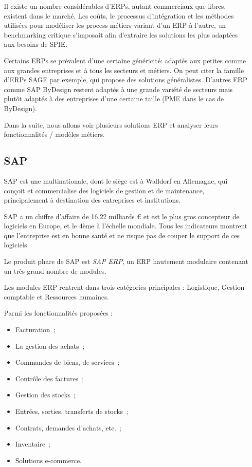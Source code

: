     Il existe un nombre considérables d'ERPs, autant commerciaux que libres, existent dans le marché. Les coûts, le processus d'intégration et les méthodes utilisées pour modéliser les process métiers variant d'un ERP à l'autre, un benchmarking critique s'imposait afin d'extraire les solutions les plus adaptées aux besoins de SPIE.

    Certains ERPs se prévalent d'une certaine généricité: adaptés aux petites comme aux grandes entreprises et à tous les secteurs et métiers. On peut citer la famille d'ERPs SAGE par exemple, qui propose des solutions généralistes. D'autres ERP comme SAP ByDesign restent adaptés à une grande variété de secteurs mais plutôt adaptés à des entreprises d'une certaine taille (PME dans le cas de ByDesign).

    Dans la suite, nous allons voir plusieurs solutions ERP et analyser leurs fonctionnalités / modèles métiers.

    \subsection{SAP}

        SAP est une multinationale, dont le siège est à Walldorf en Allemagne, qui conçoit et commercialise des logiciels de gestion et de maintenance, principalement à destination des entreprises et institutions.

        SAP a un chiffre d'affaire de 16,22 milliards € et est le plus gros concepteur de logiciels en Europe, et le 4ème à l'échelle mondiale. Tous les indicateurs montrent que l'entreprise est en bonne santé et ne risque pas de couper le support de ces logiciels.

        Le produit phare de SAP est \textit{SAP ERP}, un ERP hautement modulaire contenant un très grand nombre de modules.

        Les modules ERP rentrent dans trois catégories principales : Logistique, Gestion comptable et Ressources humaines.

        Parmi les fonctionnalités proposées :

        \begin{itemize}
            \item Facturation~;
            \item La gestion des achats~;
            \item Commandes de biens, de services~;
            \item Contrôle des factures~;
            \item Gestion des stocks~;
            \item Entrées, sorties, transferts de stocks~;
            \item Contrats, demandes d'achats, etc.~;
            \item Inventaire~;
            \item Solutions e-commerce.
        \end{itemize}


